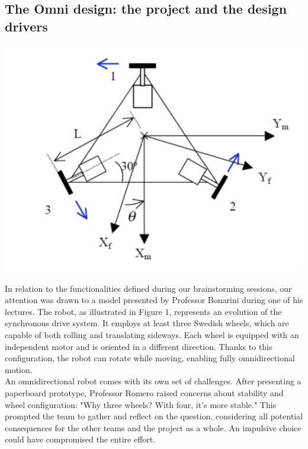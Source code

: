 \documentclass{article}
\begin{document}
\subsection{The Omni design: the project and the design drivers}
\noindent
\begin{minipage}[t]{0.6\textwidth}
  \vspace{0pt}
  \includegraphics[width=\linewidth]{photos/omnirob.png}
\end{minipage}
\hfill
\begin{minipage}[t]{0.4\textwidth}
    \vspace{0pt}
    In relation to the functionalities defined during our brainstorming sessions, our attention was drawn to a model presented by Professor Bonarini during one of his lectures.
    The robot, as illustrated in Figure 1, represents an evolution of the synchronous drive system.
    It employs at least three Swedish wheels, which are capable of both rolling and translating sideways. Each wheel is equipped with an independent motor and is oriented in a different direction.
    Thanks to this configuration, the robot can rotate while moving, enabling fully omnidirectional motion. \\

    An omnidirectional robot comes with its own set of challenges. After presenting a paperboard prototype, Professor Romero raised concerns about stability and wheel configuration: "Why three wheels? With four, it's more stable." This prompted the team to gather and reflect on the question, considering all potential consequences for the other teams and the project as a whole. An impulsive choice could have compromised the entire effort. \\

    \end{minipage}
    
\end{document}
